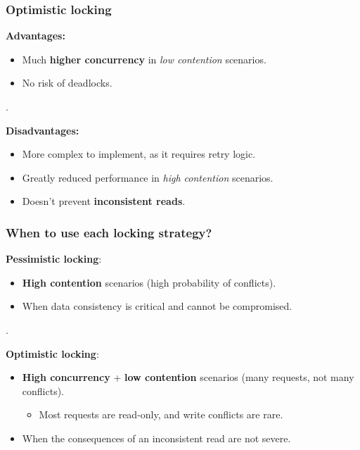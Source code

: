 \documentclass{beamer}
\begin{document}
\begin{frame}
  \frametitle{Optimistic locking}

  \textbf{Advantages:}
  \begin{itemize}
    \item Much \textbf{higher concurrency} in \textit{low contention} scenarios.
    \item No risk of deadlocks.
  \end{itemize}
  {\color{white} . }

  \textbf{Disadvantages:}
  \begin{itemize}
    \item More complex to implement, as it requires retry logic.
    \item Greatly reduced performance in \textit{high contention} scenarios.
    \item Doesn't prevent \textbf{inconsistent reads}.
  \end{itemize}
\end{frame}

\begin{frame}
  \frametitle{When to use each locking strategy?}

  \textbf{Pessimistic locking}:
  \begin{itemize}
    \item \textbf{High contention} scenarios (high probability of conflicts).
    \item When data consistency is critical and cannot be compromised.
  \end{itemize}

  {\color{white} . }

  \textbf{Optimistic locking}:
  \begin{itemize}
    \item \textbf{High concurrency} + \textbf{low contention} scenarios (many requests, not many conflicts).
    \begin{itemize}
      \item Most requests are read-only, and write conflicts are rare.
    \end{itemize}
    \item When the consequences of an inconsistent read are not severe.
  \end{itemize}

\end{frame}
\end{document}
